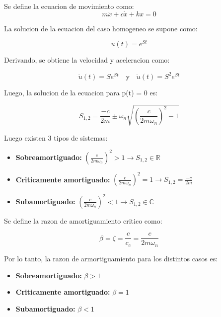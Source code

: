 \documentclass{article}  %
\begin{document}
Se define la ecuacion de movimiento como:
\begin{equation}
    m \ddot{x} + c \dot{x} + kx = 0
\end{equation}

La solucion de la ecuacion del caso homogeneo se supone como:

\begin{equation}
    u(t) = e^{St}
\end{equation}

Derivando, se obtiene la velocidad y aceleracion como:

\begin{equation}
    \dot{u}(t) = Se^{St} \quad \text{y} \quad \ddot{u}(t) = S^2 e^{St}
\end{equation}

Luego, la solucion de la ecuacion para p(t) = 0 es:

\begin{equation}
    S_{1,2} =  \frac{-c}{2m} \pm \omega_n \sqrt{(\frac{c}{2m\omega_n})^2 - 1}
\end{equation}

Luego existen 3 tipos de sistemas:
\begin{itemize}
    \item \textbf{Sobreamortiguado:} $(\frac{c}{2m\omega_n})^2 > 1 \rightarrow S_{1,2} \in \mathbb{R}$ 
    \item \textbf{Criticamente amortiguado:} $(\frac{c}{2m\omega_n})^2 = 1  \rightarrow S_{1,2} = \frac{-c}{2m}$
    \item \textbf{Subamortiguado:} $(\frac{c}{2m\omega_n})^2 < 1 \rightarrow S_{1,2} \in \mathbb{C}$
\end{itemize}

Se define la razon de amortiguamiento critico como:

\begin{equation}
    \beta = \zeta = \frac{c}{c_c} = \frac{c}{2m\omega_n}
\end{equation}

Por lo tanto, la razon de armortiguamiento para los distintos casos es:

\begin{itemize}
    \item \textbf{Sobreamortiguado:} $\beta > 1$
    \item \textbf{Criticamente amortiguado:} $\beta = 1$
    \item \textbf{Subamortiguado:} $\beta < 1$
\end{itemize}
\end{document}
